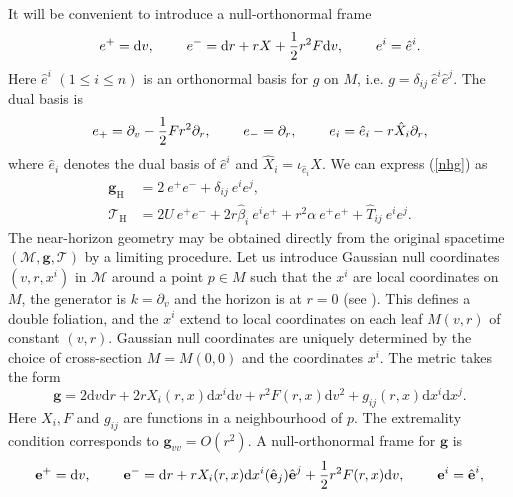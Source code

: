 \documentclass[11pt, reqno]{amsart}
\theoremstyle{plain}
\theoremstyle{definition}
\numberwithin{equation}{section}
\begin{document}
It will be convenient to introduce a null-orthonormal frame
\begin{equation} \label{onbdef}
    e^+ = \text{d}v, \hspace{.8cm} e^- = \text{d}r + r X + \frac 12r^2F\text{d}v, \hspace{.8cm} e^i = \hat{e}^i.
\end{equation}
Here $\hat{e}^i$  $(1 \leq i \leq n)$ is an orthonormal basis for $g$ on $M$, i.e. $g = \delta_{ij}\:\hat{e}^i\hat{e}^j$. The dual basis is
\begin{equation} \label{onbdefvec}
    e_+ = \partial_v - \frac 12 F r^2 \partial_r, \hspace{.8cm} e_- = \partial_r, \hspace{.8cm} e_i = \hat{e}_i - r\hat{X}_i\partial_r,
\end{equation}
where $\hat{e}_i$ denotes the dual basis of $\hat{e}^i$ and $\hat{X}_i = \iota_{\hat{e}_i}X$. We can express (\ref{nhg}) as 
\begin{subequations} \label{onb}
\begin{align} \label{onba}
    \textbf{g}_{\text{H}} &= 2\:e^+ e^- + \delta_{ij}\:e^ie^j, \\
    \mathcal{T}_{\text{H}} &= 2U\:e^+ e^- + 2r\hat{\beta}_i\:e^i e^+ + r^2\alpha\: e^+ e^+ +\hat{T}_{ij}\:e^i e^j. \label{onbb}
    \end{align}
\end{subequations}
The near-horizon geometry may be obtained directly from the original spacetime $(\mathcal{M},\textbf{g},\mathcal{T})$ by a limiting procedure. Let us introduce Gaussian null coordinates $(v,r,x^i)$ in $\mathcal{M}$ around a point $p \in M$ such that the $x^i$ are local coordinates on $M$, the generator is $k = \partial_v$ and the horizon is at $r = 0$ (see \cite{MI83}). This defines a double foliation, and the $x^i$ extend to local coordinates on each leaf $M(v,r)$ of constant $(v,r)$. Gaussian null coordinates are uniquely determined by the choice of cross-section $M = M(0,0)$ and the coordinates $x^i$. The metric takes the form
\begin{equation} \label{ggnc}
    \textbf{g} = 2\text{d}v\text{d}r + 2rX_i(r,x)\text{d}x^i\text{d}v + r^2 F(r,x)\text{d}v^2 + g_{ij}(r,x)\text{d}x^i\text{d}x^j.
\end{equation}
Here $X_i, F$ and $g_{ij}$ are functions in a neighbourhood of $p$. The extremality condition corresponds to $\textbf{g}_{vv} = O(r^2)$. A null-orthonormal frame for $\textbf{g}$ is
\begin{equation} \label{onbs}
    \textbf{e}^+ = \text{d}v, \hspace{.8cm} \textbf{e}^- = \text{d}r + rX_i(r,x)\text{d}x^i(\hat{\textbf{e}}_j)\hat{\textbf{e}}^j + \frac 12r^2F(r,x)\text{d}v, \hspace{.8cm} \textbf{e}^i = \hat{\textbf{e}}^i,
\end{equation}
\end{document}
